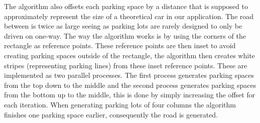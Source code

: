 The algorithm also offsets each parking space by a distance that is supposed to approximately represent the size of a theoretical car in our application. 
The road between is twice as large seeing as parking lots are rarely designed to only be driven on one-way.
The way the algorithm works is by using the corners of the rectangle as reference points.
These reference points are then inset to avoid creating parking spaces outside of the rectangle, the algorithm then creates white stripes (representing parking lines) from these inset reference points.
These are implemented as two parallel processes. 
The first process generates parking spaces from the top down to the middle and the second process generates parking spaces from the bottom up to the middle, this is done by simply increasing the offset for each iteration.
When generating parking lots of four columns the algorithm finishes one parking space earlier, consequently the road is generated. 


